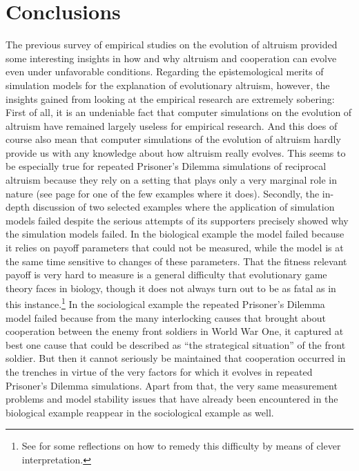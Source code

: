 \section{Conclusions}

The previous survey of empirical studies on the evolution of altruism provided
some interesting insights in how and why altruism and cooperation can evolve
even under unfavorable conditions. Regarding the epistemological merits of
simulation models for the explanation of evolutionary altruism, however, the
insights gained from looking at the empirical research are extremely sobering:
First of all, it is an undeniable fact that computer simulations on the
evolution of altruism have remained largely useless for empirical
research. And this does of course also mean that computer simulations of the
evolution of altruism hardly provide us with any knowledge about how altruism
really evolves. This seems to be especially true for repeated Prisoner's
Dilemma simulations of reciprocal altruism because they rely on a setting
that plays only a very marginal role in nature (see page
\pageref{impalaGrooming} for one of the few examples where it does). Secondly,
the in-depth discussion of two selected examples where the application of
simulation models failed despite the serious attempts of its supporters
precisely showed why the simulation models failed. In the biological example
the model failed because it relies on payoff parameters that could not be
measured, while the model is at the same time sensitive to changes of these
parameters. That the fitness relevant payoff is very hard to measure is a
general difficulty that evolutionary game theory faces in biology, though it
does not always turn out to be as fatal as in this instance.\footnote{See
  \cite[p.\ 9ff.]{hammerstein:1998} for some reflections on how to remedy this
  difficulty by means of clever interpretation.} In the sociological example
the repeated Prisoner's Dilemma model failed because from the many
interlocking causes that brought about cooperation between the enemy front
soldiers in World War One, it captured at best one cause that could be
described as ``the strategical situation'' of the front soldier. But then it
cannot seriously be maintained that cooperation occurred in the trenches in
virtue of the very factors for which it evolves in repeated Prisoner's Dilemma
simulations. Apart from that, the very same measurement problems and model
stability issues that have already been encountered in the biological example
reappear in the sociological example as well.

